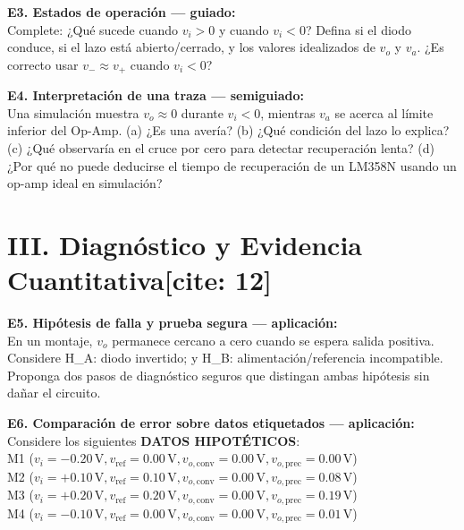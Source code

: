\documentclass[10pt, a4paper]{article}
\begin{document}
\noindent\textbf{E3. Estados de operación — guiado:}\\
Complete: ¿Qué sucede cuando $v_i > 0$ y cuando $v_i < 0$? Defina si el diodo conduce, si el lazo está abierto/cerrado, y los valores idealizados de $v_o$ y $v_a$. ¿Es correcto usar $v_- \approx v_+$ cuando $v_i < 0$?

\vspace{1.5cm}

\noindent\textbf{E4. Interpretación de una traza — semiguiado:}\\
Una simulación muestra $v_o \approx 0$ durante $v_i < 0$, mientras $v_a$ se acerca al límite inferior del Op-Amp. (a) ¿Es una avería? (b) ¿Qué condición del lazo lo explica? (c) ¿Qué observaría en el cruce por cero para detectar recuperación lenta? (d) ¿Por qué no puede deducirse el tiempo de recuperación de un LM358N usando un op-amp ideal en simulación?

\vspace{1.8cm}

\section*{III. Diagnóstico y Evidencia Cuantitativa[cite: 12]}
\textbf{E5. Hipótesis de falla y prueba segura — aplicación:}\\
En un montaje, $v_o$ permanece cercano a cero cuando se espera salida positiva. Considere H\_A: diodo invertido; y H\_B: alimentación/referencia incompatible. Proponga dos pasos de diagnóstico seguros que distingan ambas hipótesis sin dañar el circuito.

\vspace{1.8cm}

\noindent\textbf{E6. Comparación de error sobre datos etiquetados — aplicación:}\\
Considere los siguientes \textbf{DATOS HIPOTÉTICOS}:\\
M1 ($v_i = -0.20\,\text{V}, v_{\mathrm{ref}} = 0.00\,\text{V}, v_{o,\mathrm{conv}} = 0.00\,\text{V}, v_{o,\mathrm{prec}} = 0.00\,\text{V}$)\\
M2 ($v_i = +0.10\,\text{V}, v_{\mathrm{ref}} = 0.10\,\text{V}, v_{o,\mathrm{conv}} = 0.00\,\text{V}, v_{o,\mathrm{prec}} = 0.08\,\text{V}$)\\
M3 ($v_i = +0.20\,\text{V}, v_{\mathrm{ref}} = 0.20\,\text{V}, v_{o,\mathrm{conv}} = 0.00\,\text{V}, v_{o,\mathrm{prec}} = 0.19\,\text{V}$)\\
M4 ($v_i = -0.10\,\text{V}, v_{\mathrm{ref}} = 0.00\,\text{V}, v_{o,\mathrm{conv}} = 0.00\,\text{V}, v_{o,\mathrm{prec}} = 0.01\,\text{V}$)
\end{document}
